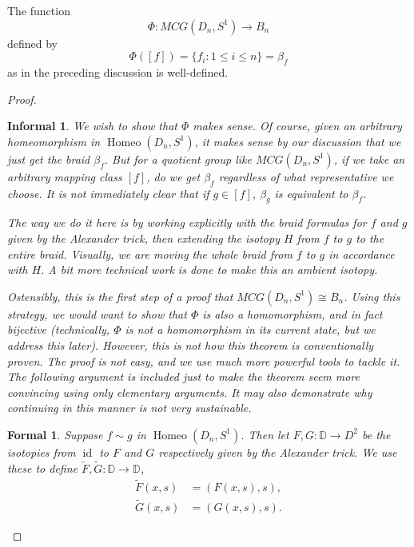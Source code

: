 \documentclass{amsart}
\DeclareMathOperator{\id}{id}
\DeclareMathOperator{\Homeo}{Homeo}
\newtheorem*{formal}{Formal}
\newtheorem*{informal}{Informal}
\begin{document}
\begin{proposition}\label{well-defined-braid}
   The function 
	\[
      \Phi: MCG(D_n, S^1)\to B_n
   \]
	defined by
	\[
		\Phi([f]) = \{f_i: 1\le i\le n\} = \beta_f
   \] 
	as in the preceding discussion is well-defined.
\end{proposition}
\begin{proof}
	\begin{informal}
		We wish to show that \(\Phi\) makes sense. Of course, given an arbitrary
		homeomorphism in \(\Homeo(D_n, S^1)\), it makes sense by our discussion
		that we just get the braid \(\beta_f\). But for a quotient group like
		\(MCG(D_n, S^1)\), if we take an arbitrary mapping class \([f]\), do we
		get \(\beta_f\) regardless of what representative we choose. It is not
		immediately clear that if \(g\in [f]\), \(\beta_g\) is equivalent to
		\(\beta_f\).

		The way we do it here is by working explicitly with the braid formulas
		for \(f\) and \(g\) given by the Alexander trick, then extending the
		isotopy \(H\) from \(f\) to \(g\) to the entire braid. Visually, we are
		moving the
		whole braid from \(f\) to \(g\) in accordance with \(H\). A bit more
		technical work is done to make this an ambient isotopy.

	   Ostensibly, this is the first step of a proof that \(MCG(D_n, S^1)\cong
		B_n\). Using this strategy, we would want to show that \(\Phi\) is also a
		homomorphism, and in fact bijective (technically, \(\Phi\) is not a
		homomorphism in its current state, but we address this later). However,
		this is not how this
		theorem is conventionally proven. The proof is not easy, and we
		use much more powerful tools to tackle it. The following
		argument is included just to make the theorem seem more convincing using
		only elementary arguments. It may also demonstrate why
		continuing in this manner is not very sustainable.
	\end{informal}

	\begin{formal}
		Suppose \(f\sim g\) in \(\Homeo(D_n, S^1)\). Then let \(F, G:
		\mathbb{D}\to D^2\) be the isotopies from \(\id\) to \(F\) and \(G\)
		respectively given by the Alexander trick.
		We use these to define \(\widetilde{F}, \widetilde{G}: \mathbb{D}\to
		\mathbb{D}\),
		\begin{align*}
			\widetilde{F}(x, s) &= (F(x, s), s),\\
			\widetilde{G}(x, s) &= (G(x, s), s).
		\end{align*}


\end{formal}
\end{proof}
\end{document}

